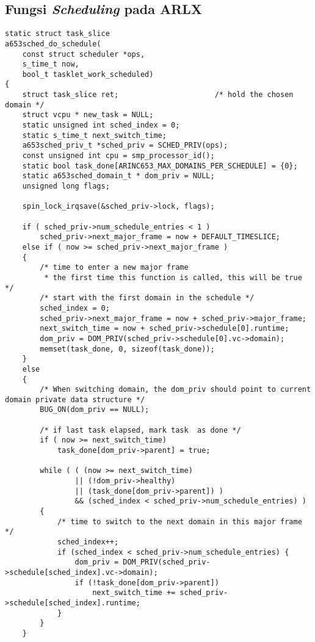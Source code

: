 
\begin{appendices}
\chapter{Fungsi \textit{Scheduling} pada ARLX}
\label{appendix:a653sched_do_schedule}

\begin{lstlisting}
static struct task_slice
a653sched_do_schedule(
    const struct scheduler *ops,
    s_time_t now,
    bool_t tasklet_work_scheduled)
{
    struct task_slice ret;                      /* hold the chosen domain */
    struct vcpu * new_task = NULL;
    static unsigned int sched_index = 0;
    static s_time_t next_switch_time;
    a653sched_priv_t *sched_priv = SCHED_PRIV(ops);
    const unsigned int cpu = smp_processor_id();
    static bool task_done[ARINC653_MAX_DOMAINS_PER_SCHEDULE] = {0};
    static a653sched_domain_t * dom_priv = NULL;
    unsigned long flags;

    spin_lock_irqsave(&sched_priv->lock, flags);

    if ( sched_priv->num_schedule_entries < 1 )
        sched_priv->next_major_frame = now + DEFAULT_TIMESLICE;
    else if ( now >= sched_priv->next_major_frame )
    {
        /* time to enter a new major frame
         * the first time this function is called, this will be true */
        /* start with the first domain in the schedule */
        sched_index = 0;
        sched_priv->next_major_frame = now + sched_priv->major_frame;
        next_switch_time = now + sched_priv->schedule[0].runtime;
        dom_priv = DOM_PRIV(sched_priv->schedule[0].vc->domain);
        memset(task_done, 0, sizeof(task_done));
    }
    else
    {
        /* When switching domain, the dom_priv should point to current domain private data structure */
        BUG_ON(dom_priv == NULL);

        /* if last task elapsed, mark task  as done */
        if ( now >= next_switch_time) 
            task_done[dom_priv->parent] = true;

        while ( ( (now >= next_switch_time)
                || (!dom_priv->healthy)
                || (task_done[dom_priv->parent]) )
                && (sched_index < sched_priv->num_schedule_entries) )
        {
            /* time to switch to the next domain in this major frame */
            sched_index++;
            if (sched_index < sched_priv->num_schedule_entries) {
                dom_priv = DOM_PRIV(sched_priv->schedule[sched_index].vc->domain);
                if (!task_done[dom_priv->parent])
                    next_switch_time += sched_priv->schedule[sched_index].runtime;
            }
        }
    }


\end{lstlisting}
\end{appendices}
